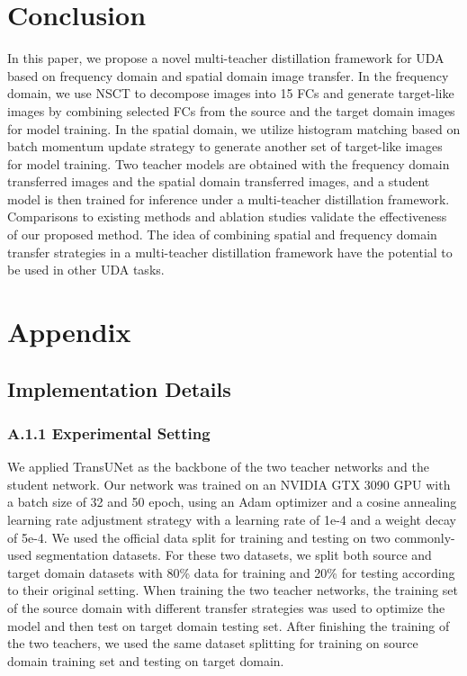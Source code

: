 \documentclass[letterpaper]{article} %
\begin{document}
\section{Conclusion}
In this paper, we propose a novel multi-teacher distillation framework for UDA based on frequency 
domain and spatial domain image transfer. In the frequency domain, we use NSCT to decompose images 
into 15 FCs and generate target-like images by combining selected FCs from the source and the target 
domain images for model training. In the spatial domain, we utilize histogram matching based on batch 
momentum update strategy to generate another set of target-like images for model training. Two teacher 
models are obtained with the frequency domain transferred images and the spatial domain transferred 
images, and a student model is then trained for inference under a multi-teacher distillation framework. 
Comparisons to existing methods and ablation studies validate the effectiveness of our proposed method. 
The idea of combining spatial and frequency domain transfer strategies in a multi-teacher distillation 
framework have the potential to be used in other UDA tasks.



\appendix

\section{Appendix}
\setcounter{table}{0}  
\setcounter{figure}{0}
\renewcommand{\thetable}{A\arabic{table}}
\renewcommand{\thefigure}{A\arabic{figure}}

\subsection{Implementation Details}

\subsubsection{A.1.1 Experimental Setting}

We applied TransUNet \cite{37} as the backbone of the two teacher networks and the student network. Our network was trained on an NVIDIA GTX 3090 
GPU with a batch size of 32 and 50 epoch, using an Adam optimizer and a cosine annealing learning rate adjustment strategy with a learning rate 
of 1e-4 and a weight decay of 5e-4. We used the official data split for training and testing on two commonly-used segmentation datasets. 
For these two datasets, we split both source and target domain datasets with 80\% data for training and 20\% for testing according to their 
original setting. When training the two teacher networks, the training set of the source domain with different transfer strategies was used to 
optimize the model and then test on target domain testing set. After finishing the training of the two teachers, we used the same dataset splitting 
for training on source domain training set and testing on target domain.
\end{document}
